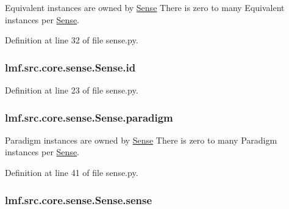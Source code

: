 Equivalent instances are owned by \hyperlink{classlmf_1_1src_1_1core_1_1sense_1_1_sense}{Sense} There is zero to many Equivalent instances per \hyperlink{classlmf_1_1src_1_1core_1_1sense_1_1_sense}{Sense}. 



Definition at line 32 of file sense.\+py.

\hypertarget{classlmf_1_1src_1_1core_1_1sense_1_1_sense_ae0febecc9ab2951c5c6bb82f675187bc}{
\subsubsection[{id}]{\setlength{\rightskip}{0pt plus 5cm}lmf.\+src.\+core.\+sense.\+Sense.\+id}}\label{classlmf_1_1src_1_1core_1_1sense_1_1_sense_ae0febecc9ab2951c5c6bb82f675187bc}


Definition at line 23 of file sense.\+py.

\hypertarget{classlmf_1_1src_1_1core_1_1sense_1_1_sense_a3f36a95173e4d4e7244e407a725dd3a9}{
\subsubsection[{paradigm}]{\setlength{\rightskip}{0pt plus 5cm}lmf.\+src.\+core.\+sense.\+Sense.\+paradigm}}\label{classlmf_1_1src_1_1core_1_1sense_1_1_sense_a3f36a95173e4d4e7244e407a725dd3a9}


Paradigm instances are owned by \hyperlink{classlmf_1_1src_1_1core_1_1sense_1_1_sense}{Sense} There is zero to many Paradigm instances per \hyperlink{classlmf_1_1src_1_1core_1_1sense_1_1_sense}{Sense}. 



Definition at line 41 of file sense.\+py.

\hypertarget{classlmf_1_1src_1_1core_1_1sense_1_1_sense_a51524fd8eb1bc869c2ecfc681339d8aa}{
\subsubsection[{sense}]{\setlength{\rightskip}{0pt plus 5cm}lmf.\+src.\+core.\+sense.\+Sense.\+sense}}\label{classlmf_1_1src_1_1core_1_1sense_1_1_sense_a51524fd8eb1bc869c2ecfc681339d8aa}


